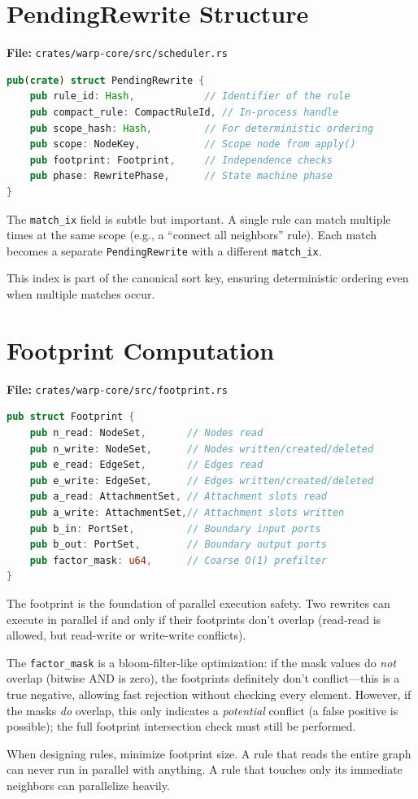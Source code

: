 \section{PendingRewrite Structure}

\textbf{File:} \texttt{crates/warp-core/src/scheduler.rs}

\begin{lstlisting}[language=Rust]
pub(crate) struct PendingRewrite {
    pub rule_id: Hash,            // Identifier of the rule
    pub compact_rule: CompactRuleId, // In-process handle
    pub scope_hash: Hash,         // For deterministic ordering
    pub scope: NodeKey,           // Scope node from apply()
    pub footprint: Footprint,     // Independence checks
    pub phase: RewritePhase,      // State machine phase
}
\end{lstlisting}

\begin{commentary}
The \texttt{match\_ix} field is subtle but important. A single rule can match multiple times at the same scope (e.g., a ``connect all neighbors'' rule). Each match becomes a separate \texttt{PendingRewrite} with a different \texttt{match\_ix}.

This index is part of the canonical sort key, ensuring deterministic ordering even when multiple matches occur.
\end{commentary}

\section{Footprint Computation}

\textbf{File:} \texttt{crates/warp-core/src/footprint.rs}

\begin{lstlisting}[language=Rust]
pub struct Footprint {
    pub n_read: NodeSet,       // Nodes read
    pub n_write: NodeSet,      // Nodes written/created/deleted
    pub e_read: EdgeSet,       // Edges read
    pub e_write: EdgeSet,      // Edges written/created/deleted
    pub a_read: AttachmentSet, // Attachment slots read
    pub a_write: AttachmentSet,// Attachment slots written
    pub b_in: PortSet,         // Boundary input ports
    pub b_out: PortSet,        // Boundary output ports
    pub factor_mask: u64,      // Coarse O(1) prefilter
}
\end{lstlisting}

\begin{bigpicture}
The footprint is the foundation of parallel execution safety. Two rewrites can execute in parallel if and only if their footprints don't overlap (read-read is allowed, but read-write or write-write conflicts).

The \texttt{factor\_mask} is a bloom-filter-like optimization: if the mask values do \emph{not} overlap (bitwise AND is zero), the footprints definitely don't conflict---this is a true negative, allowing fast rejection without checking every element. However, if the masks \emph{do} overlap, this only indicates a \emph{potential} conflict (a false positive is possible); the full footprint intersection check must still be performed.
\end{bigpicture}

\begin{protip}
When designing rules, minimize footprint size. A rule that reads the entire graph can never run in parallel with anything. A rule that touches only its immediate neighbors can parallelize heavily.
\end{protip}
